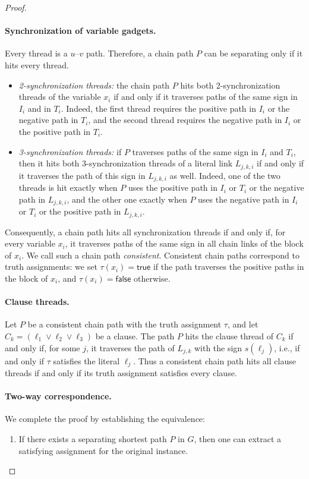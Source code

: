\begin{proof}
\paragraph{Synchronization of variable gadgets.}
Every thread is a $u$--$v$ path. Therefore, a chain path $P$ can be separating only if it hits every thread.
\begin{itemize}
    \item \emph{2-synchronization threads:} the chain path $P$ hits both 2-synchronization threads of the variable $x_i$ if and only if it traverses paths of the same sign in $I_i$ and in $T_i$.
    Indeed, the first thread requires the positive path in $I_i$ or the negative path in $T_i$, and the second thread requires the negative path in $I_i$ or the positive path in $T_i$.
    \item \emph{3-synchronization threads:} if $P$ traverses paths of the same sign in $I_i$ and $T_i$, then it hits both 3-synchronization threads of a literal link $L_{j,k,i}$ if and only if it traverses the path of this sign in $L_{j,k,i}$ as well.
    Indeed, one of the two threads is hit exactly when $P$ uses the positive path in $I_i$ or $T_i$ or the negative path in $L_{j,k,i}$, and the other one exactly when $P$ uses the negative path in $I_i$ or $T_i$ or the positive path in $L_{j,k,i}$.
\end{itemize}
Consequently, a chain path hits all synchronization threads if and only if, for every variable $x_i$, it traverses paths of the same sign in all chain links of the block of $x_i$.
We call such a chain path \emph{consistent}.
Consistent chain paths correspond to truth assignments: we set $\tau(x_i)=\mathsf{true}$ if the path traverses the positive paths in the block of $x_i$, and $\tau(x_i)=\mathsf{false}$ otherwise.

\paragraph{Clause threads.}
Let $P$ be a consistent chain path with the truth assignment $\tau$, and let $C_k = (\ell_1 \vee \ell_2 \vee \ell_3)$ be a clause.
The path $P$ hits the clause thread of $C_k$ if and only if, for some $j$, it traverses the path of $L_{j,k}$ with the sign $s(\ell_j)$, i.e., if and only if $\tau$ satisfies the literal $\ell_j$.
Thus a consistent chain path hits all clause threads if and only if its truth assignment satisfies every clause.

\paragraph{Two-way correspondence.}
We complete the proof by establishing the equivalence:
\begin{enumerate}[label=(\alph*)]
    \item If there exists a separating shortest path $P$ in $G$, then one can extract a satisfying assignment for the original \ThreeSAT{} instance.


\end{enumerate}
\end{proof}
